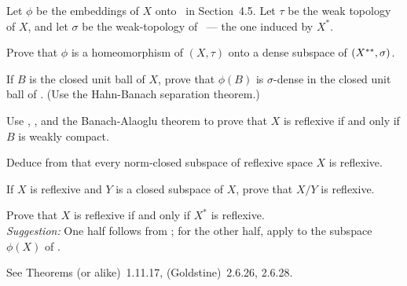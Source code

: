 \begin{enumerate}

\begin{excopy}
Let \(\phi\) be the embeddings of $X$ onto \Xss\ in Section~4.5.
Let \(\tau\) be the weak topology of $X$, and let \(\sigma\)
be the weak\upstar-topology of \Xss\ --- the one induced by \(X^*\).
\begin{itemize}

Prove that \(\phi\) is a homeomorphism of \((X,\tau)\) onto a dense subspace
of \((X^{**}, \sigma)\).

If $B$ is the closed unit ball of $X$, prove that \(\phi(B)\)
is \(\sigma\)-dense in the closed unit ball
of \Xss. (Use the Hahn-Banach separation theorem.)

Use , , and the Banach-Alaoglu theorem to prove that $X$
 is reflexive if and only if $B$ is weakly compact.

Deduce from  that every norm-closed subspace of reflexive space $X$
 is reflexive.

If $X$ is reflexive and $Y$ is a closed subspace of $X$, prove that \(X/Y\) 
is reflexive.

Prove that $X$ is reflexive if and only if \(X^*\) is reflexive.\\
\emph{Suggestion:} One half follows from ; for the other half,
 apply  to the subspace \(\phi(X)\) of \Xss.

\end{itemize}
\end{excopy}

See \cite{Megginson1998} Theorems (or alike)~1.11.17,
(Goldstine)~2.6.26, 2.6.28.


\end{enumerate}
